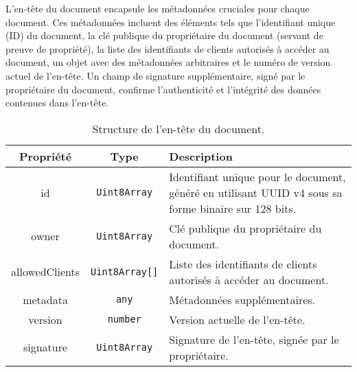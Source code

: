 L'en-tête du document encapsule les métadonnées cruciales pour chaque document.
Ces métadonnées incluent des éléments tels que l'identifiant unique (ID) du document, la clé publique du propriétaire du document (servant de preuve de propriété), la liste des identifiants de clients autorisés à accéder au document, un objet avec des métadonnées arbitraires et le numéro de version actuel de l'en-tête. Un champ de signature supplémentaire, signé par le propriétaire du document, confirme l'authenticité et l'intégrité des données contenues dans l'en-tête.

\setlength{\extrarowheight}{2pt}

\begin{table}[h]
    \begin{center}
        \caption{Structure de l'en-tête du document.}
        \begin{tabularx}{\textwidth}{|c|c|X|}
            \hline
            \rowcolor{gray!20}
            \textbf{Propriété} & \textbf{Type}         & \textbf{Description}                                                                                 \\
            \hline
            id                 & \texttt{Uint8Array}   & Identifiant unique pour le document, généré en utilisant UUID v4 sous sa forme binaire sur 128 bits. \\
            \hline
            owner              & \texttt{Uint8Array}   & Clé publique du propriétaire du document.                                                            \\
            \hline
            allowedClients     & \texttt{Uint8Array[]} & Liste des identifiants de clients autorisés à accéder au document.                                   \\
            \hline
            metadata           & \texttt{any}          & Métadonnées supplémentaires.                                                                         \\
            \hline
            version            & \texttt{number}       & Version actuelle de l'en-tête.                                                                       \\
            \hline
            signature          & \texttt{Uint8Array}   & Signature de l'en-tête, signée par le propriétaire.                                                  \\
            \hline
        \end{tabularx}
    \end{center}
\end{table}



